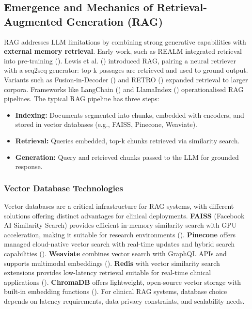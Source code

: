 \subsection{Emergence and Mechanics of Retrieval-Augmented Generation (RAG)}

RAG addresses LLM limitations by combining strong generative capabilities with \textbf{external memory retrieval}. Early work, such as REALM integrated retrieval into pre-training (\citep{guu2020realm}). Lewis et al. (\citeyear{lewis2020rag}) introduced RAG, pairing a neural retriever with a seq2seq generator: top-k passages are retrieved and used to ground output. Variants such as Fusion-in-Decoder (\citep{izacard2021leveraging}) and RETRO (\citep{borgeaud2022retro}) expanded retrieval to larger corpora. Frameworks like LangChain (\citep{langchain2023}) and LlamaIndex (\citep{llamaindex2023}) operationalised RAG pipelines.
\newpage
The typical RAG pipeline has three steps:
\begin{itemize}
  \item \textbf{Indexing:} Documents segmented into chunks, embedded with encoders, and stored in vector databases (e.g., FAISS, Pinecone, Weaviate).
  \item \textbf{Retrieval:} Queries embedded, top-k chunks retrieved via similarity search.
  \item \textbf{Generation:} Query and retrieved chunks passed to the LLM for grounded response.
\end{itemize}

\subsubsection{Vector Database Technologies}
Vector databases are a critical infrastructure for RAG systems, with different solutions offering distinct advantages for clinical deployments. \textbf{FAISS} (Facebook AI Similarity Search) provides efficient in-memory similarity search with GPU acceleration, making it suitable for research environments (\citep{douze2025faiss}). \textbf{Pinecone} offers managed cloud-native vector search with real-time updates and hybrid search capabilities (\citep{pinecone2023}). \textbf{Weaviate} combines vector search with GraphQL APIs and supports multimodal embeddings (\citep{weaviate2023}). \textbf{Redis} with vector similarity search extensions provides low-latency retrieval suitable for real-time clinical applications (\citep{redis2023vector}). \textbf{ChromaDB} offers lightweight, open-source vector storage with built-in embedding functions (\citep{chromadb2023}). For clinical RAG systems, database choice depends on latency requirements, data privacy constraints, and scalability needs.

